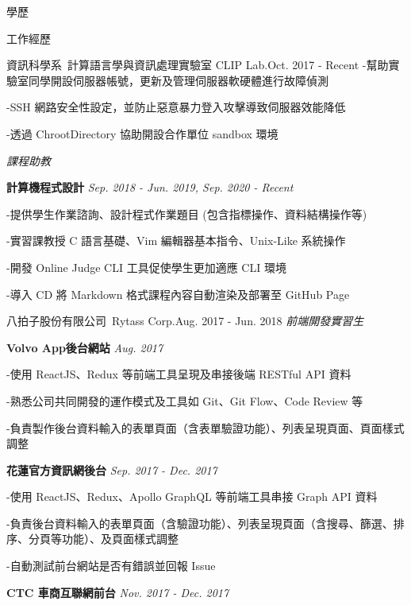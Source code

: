 \documentclass{resume} %
\begin{document}
\begin{rSection}{\Large 學歷}
\begin{rSection}{\Large 工作經歷}
\begin{rSubsection}{\large 資訊科學系\ 計算語言學與資訊處理實驗室 CLIP Lab.}{Oct. 2017 - Recent}
{\quad \small -幫助實驗室同學開設伺服器帳號，更新及管理伺服器軟硬體進行故障偵測}

{\quad \small -SSH 網路安全性設定，並防止惡意暴力登入攻擊導致伺服器效能降低}

{\quad \small -透過 ChrootDirectory 協助開設合作單位 sandbox 環境}

\medskip
\end{rSubsection}

\begin{rSubsection}{}{}
{\it{課程助教}}{}
\item \rm {\bf 計算機程式設計}  {\it  Sep. 2018 - Jun. 2019, Sep. 2020 - Recent}

{\quad \small -提供學生作業諮詢、設計程式作業題目 (包含指標操作、資料結構操作等)}

{\quad \small -實習課教授 C 語言基礎、Vim 編輯器基本指令、Unix-Like 系統操作}

{\quad \small -開發 Online Judge CLI 工具促使學生更加適應 CLI 環境}

{\quad \small -導入 CD 將 Markdown 格式課程內容自動渲染及部署至 GitHub Page}

\medskip

\end{rSubsection} 


\begin{rSubsection}{\large 八拍子股份有限公司\ Rytass Corp.}{Aug. 2017 - Jun. 2018} 
{\it{前端開發實習生}}{}
\item \rm {\bf {\small Volvo App}後台網站}  {\it  Aug. 2017}

{\quad \small -使用 ReactJS、Redux 等前端工具呈現及串接後端 RESTful API 資料}

{\quad \small -熟悉公司共同開發的運作模式及工具如 Git、Git Flow、Code Review 等}

{\quad \small -負責製作後台資料輸入的表單頁面（含表單驗證功能）、列表呈現頁面、頁面樣式調整}

\medskip
\item {\bf 花蓮官方資訊網後台}  {\it  Sep. 2017 - Dec. 2017}

{\quad \small -使用 ReactJS、Redux、Apollo GraphQL 等前端工具串接 Graph API 資料}

{\quad \small -負責後台資料輸入的表單頁面（含驗證功能）、列表呈現頁面（含搜尋、篩選、排序、分頁等功能）、及頁面樣式調整}

{\quad \small -自動測試前台網站是否有錯誤並回報 Issue}

\medskip
\item {\bf {\small CTC} 車商互聯網前台} {\it  Nov. 2017 - Dec. 2017}



\end{rSubsection}
\end{rSection}
\end{rSection}
\end{document}
